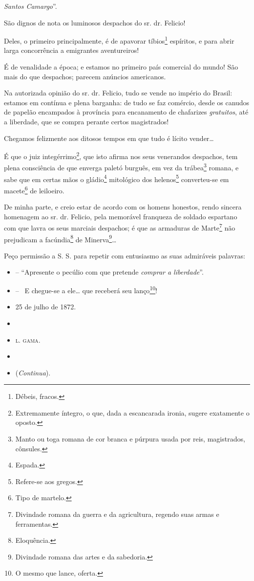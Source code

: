 \emph{Santos Camargo}''.

São dignos de nota os luminosos despachos do sr. dr. Felicio!

Deles, o primeiro principalmente, é de apavorar tíbios\footnote{
  Débeis, fracos.} espíritos, e para abrir larga concorrência a
emigrantes aventureiros!

É de venalidade a época; e estamos no primeiro país comercial do mundo!
São mais do que despachos; parecem anúncios americanos.

Na autorizada opinião do sr. dr. Felicio, tudo se vende no império do
Brasil: estamos em contínua e plena barganha: de tudo se faz comércio,
desde os canudos de papelão encampados à província para encanamento de
chafarizes \emph{gratuitos}, até a liberdade, que se compra perante
certos magistrados!

Chegamos felizmente aos ditosos tempos em que tudo é lícito vender\ldots{}

É que o juiz integérrimo\footnote{ Extremamente íntegro, o que, dada a
  escancarada ironia, sugere exatamente o oposto.}, que isto afirma nos
seus venerandos despachos, tem plena consciência de que enverga paletó
burguês, em vez da trábea\footnote{ Manto ou toga romana de cor branca
  e púrpura usada por reis, magistrados, cônsules.} romana, e sabe que
em certas mãos o gládio\footnote{ Espada.} mitológico dos
helenos\footnote{ Refere-se aos gregos.} converteu-se em
macete\footnote{ Tipo de martelo.} de leiloeiro.

De minha parte, e creio estar de acordo com os homens honestos, rendo
sincera homenagem ao sr. dr. Felicio, pela memorável franqueza de
soldado espartano com que lavra os seus marciais despachos; é que as
armaduras de Marte\footnote{ Divindade romana da guerra e da
  agricultura, regendo suas armas e ferramentas.} não prejudicam a
facúndia\footnote{ Eloquência.} de Minerva\footnote{ Divindade romana
  das artes e da sabedoria.}\ldots{}

Peço permissão a S. S. para repetir com entusiasmo as suas admiráveis
palavras:

\begin{itemize}
\item
  -- ``Apresente o pecúlio com que pretende \emph{comprar a liberdade}''.
\item
  -- ~E chegue-se a ele\ldots{} que receberá seu lanço\footnote{ O mesmo que
    lance, oferta.}!
\item
  25 de julho de 1872.
\item
\item
 \textsc{l. gama}.
\item
\item
  (\emph{Continua}).
\end{itemize}

